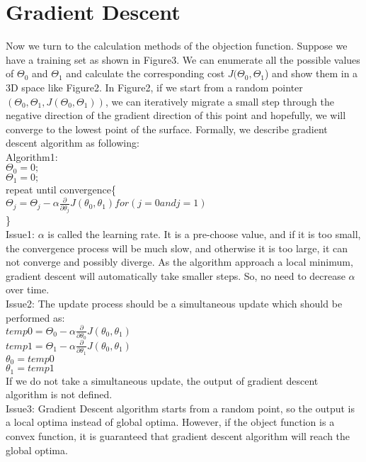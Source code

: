 \documentclass{article}
\begin{document}
\section{Gradient Descent}
Now we turn to the calculation methods of the objection function. Suppose we have a training set as shown in Figure3. We can enumerate all the possible values of $\Theta_0$ and $\Theta_1$ and calculate the corresponding cost $J(\Theta_0, \Theta_1$) and show them in a 3D space like Figure2. In Figure2, if we start from a random pointer$(\Theta_0, \Theta_1, J(\Theta_0, \Theta_1))$, we can iteratively migrate a small step through the negative direction of the gradient direction of this point and hopefully, we will converge to the lowest point of the surface.
\newline Formally, we describe gradient descent algorithm as following:\\
Algorithm1:\\
$\Theta_0 = 0;$\\
$\Theta_1 = 0;$\\
repeat until convergence\{\\
$\Theta_j = \Theta_j - \alpha\frac{\partial}{\partial \theta_j}J(\theta_0, \theta_1) for(j = 0 and j = 1)$\\
\}\\
Issue1: $\alpha$ is called the learning rate. It is a pre-choose value, and if it is too small, the convergence process will be much slow, and otherwise it is too large, it can not converge and possibly diverge. As the algorithm approach a local minimum, gradient descent will automatically take smaller steps. So, no need to decrease $\alpha$ over time.\\
Issue2: The update process should be a simultaneous update which should be performed as:\\
$temp0=\Theta_0 - \alpha\frac{\partial}{\partial \theta_0}J(\theta_0, \theta_1)$\\
$temp1=\Theta_1 - \alpha\frac{\partial}{\partial \theta_1}J(\theta_0, \theta_1)$\\
$\theta_0 = temp0$\\
$\theta_1 = temp1$\\
If we do not take a simultaneous update, the output of gradient descent algorithm is not defined.\\
Issue3: Gradient Descent algorithm starts from a random point, so the output is a local optima instead of global optima. However, if the object function is a convex function, it is guaranteed that gradient descent algorithm will reach the global optima.\\
\end{document}

